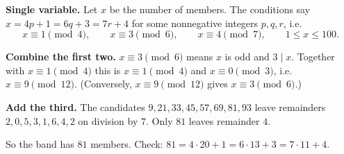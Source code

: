 \textbf{Single variable.} Let $x$ be the number of members. The conditions say $x=4p+1=6q+3=7r+4$ for some nonnegative integers $p,q,r$, i.e.
\[
x\equiv1\pmod4,\qquad x\equiv3\pmod6,\qquad x\equiv4\pmod7,\qquad 1\le x\le100 .
\]

\textbf{Combine the first two.} $x\equiv3\pmod6$ means $x$ is odd and $3\mid x$. Together with $x\equiv1\pmod4$ this is $x\equiv1\pmod4$ and $x\equiv0\pmod3$, i.e.\ $x\equiv9\pmod{12}$. (Conversely, $x\equiv9\pmod{12}$ gives $x\equiv3\pmod6$.)

\textbf{Add the third.} The candidates $9,21,33,45,57,69,81,93$ leave remainders $2,0,5,3,1,6,4,2$ on division by $7$. Only $81$ leaves remainder $4$.

So the band has $\boxed{81}$ members. Check: $81=4\cdot20+1=6\cdot13+3=7\cdot11+4$.

